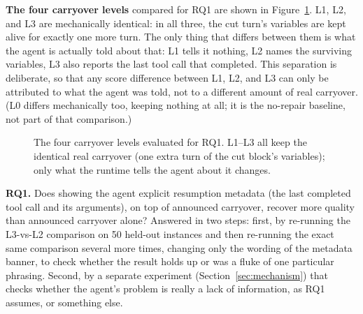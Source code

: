 \documentclass[11pt,a4paper]{article}
\begin{document}
\textbf{The four carryover levels} compared for RQ1 are shown in Figure~\ref{fig:ladder}. L1,
L2, and L3 are mechanically identical: in all three, the cut turn's variables are kept alive for
exactly one more turn. The only thing that differs between them is what the agent is actually
told about that: L1 tells it nothing, L2 names the surviving variables, L3 also reports the last
tool call that completed. This separation is deliberate, so that any score difference between
L1, L2, and L3 can only be attributed to what the agent was told, not to a different amount of
real carryover. (L0 differs mechanically too, keeping nothing at all; it is the no-repair
baseline, not part of that comparison.)

\begin{figure}[H]
\centering
{}
\caption{The four carryover levels evaluated for RQ1. L1--L3 all keep the identical real
carryover (one extra turn of the cut block's variables); only what the runtime tells the agent
about it changes.}
\label{fig:ladder}
\end{figure}

\textbf{RQ1.} Does showing the agent explicit resumption metadata (the last completed tool call
and its arguments), on top of announced carryover, recover more quality than announced carryover
alone? Answered in two steps: first, by re-running the L3-vs-L2 comparison on 50 held-out
instances and then re-running the exact same comparison several more times, changing only the
wording of the metadata banner, to check whether the result holds up or was a fluke of one
particular phrasing. Second, by a separate experiment (Section~\ref{sec:mechanism}) that checks
whether the agent's problem is really a lack of information, as RQ1 assumes, or something else.
\end{document}
